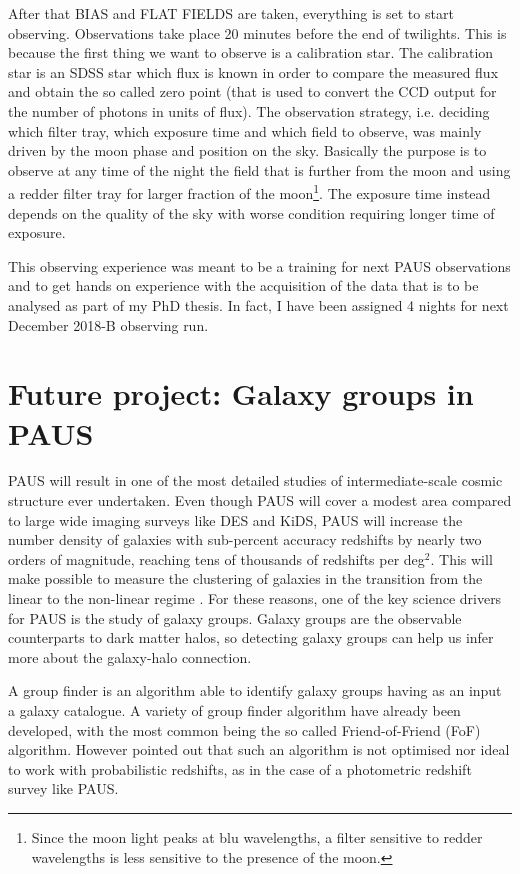 \documentclass[11pt]{article}
\begin{document}
After that BIAS and FLAT FIELDS are taken, everything is set to start observing. Observations take place 20 minutes before the end of twilights. This is because the first thing we want to observe is a calibration star. The calibration star is an SDSS star which flux is known in order to compare the measured flux and obtain the so called zero point (that is used to convert the CCD output for the number of photons in units of flux). 
The observation strategy, i.e. deciding which filter tray, which exposure time and which field to observe, was mainly driven by the moon phase and position on the sky. Basically the purpose is to observe at any time of the night the field that is further from the moon and using a redder filter tray for larger fraction of the moon\footnote{Since the moon light peaks at blu wavelengths, a filter sensitive to redder wavelengths is less sensitive to the presence of the moon.}. The exposure time instead depends on the quality of the sky with worse condition requiring longer time of exposure.

This observing experience was meant to be a training for next PAUS observations and to get hands on experience with the acquisition of the data that is to be analysed as part of my PhD thesis. 
In fact, I have been assigned 4 nights for next December 2018-B observing run.  

\section{Future project: Galaxy groups in PAUS}
\label{sec:future}
PAUS will result in one of the most detailed studies of intermediate-scale cosmic structure ever undertaken. Even though PAUS will cover a modest area compared to large wide imaging surveys like DES and KiDS, PAUS will increase the number density of galaxies with sub-percent accuracy redshifts by nearly two orders of magnitude, reaching tens of thousands of redshifts per deg$^2$. This will make possible to measure the clustering of galaxies in the transition from the linear to the non-linear regime \citep{stothert18}. For these reasons, one of the key science drivers for PAUS is the study of galaxy groups. 
Galaxy groups are the observable counterparts to dark matter halos, so detecting galaxy groups can help us infer more about the galaxy-halo connection.

A group finder is an algorithm able to identify galaxy groups having as an input a galaxy catalogue. A variety of group finder algorithm have already been developed, with the most common being the so called Friend-of-Friend (FoF) algorithm. However \cite{stothert18_thesis} pointed out that such an algorithm is not optimised nor ideal to work with probabilistic redshifts, as in the case of a photometric redshift survey like PAUS.
\end{document}

